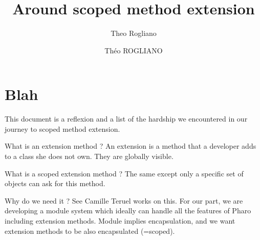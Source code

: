 \documentclass{article}
\title{}
\author{
Theo Rogliano
}
\begin{document}
\title  {Around scoped method extension}

\author  {Théo ROGLIANO}




\posttitle{\end{center}}

\maketitle

\newpage
\section{Blah}

This document is a reflexion and a list of the hardship we encountered in our journey to scoped method extension.

What is an extension method ?
An extension is a method that a developer adds to a class she does not own.
They are globally visible.

What is a scoped extension method ?
The same except only a specific set of objects can ask for this method.

Why do we need it ?
See Camille Teruel works on this. For our part, we are developing a module system which ideally can handle all the features of Pharo including extension methods.
Module implies encapsulation, and we want extension methods to be also encapsulated (=scoped).
\end{document}
